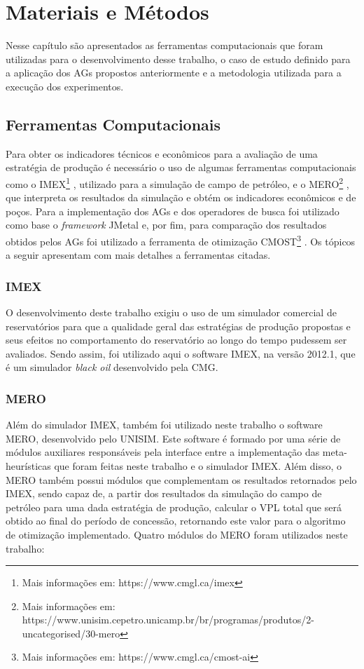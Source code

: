\chapter{Materiais e Métodos}
\label{ch:4_MateriaisMetodos}
Nesse capítulo são apresentados as ferramentas computacionais que foram utilizadas para o desenvolvimento desse trabalho, o caso de estudo definido para a aplicação dos AGs propostos anteriormente e a metodologia utilizada para a execução dos experimentos. 

\section{Ferramentas Computacionais}
\label{sec:4_FerramentasComputacionais}
Para obter os indicadores técnicos e econômicos para a avaliação de uma estratégia de produção é necessário o uso de algumas ferramentas computacionais como o IMEX\footnote{Mais informações em: https://www.cmgl.ca/imex} , utilizado para a simulação de campo de petróleo, e o MERO\footnote{Mais informações em: https://www.unisim.cepetro.unicamp.br/br/programas/produtos/2-uncategorised/30-mero} , que interpreta os resultados da simulação e obtém os indicadores econômicos e de poços. Para a implementação dos AGs e dos operadores de busca foi utilizado como base o \textit{framework} JMetal  e, por fim, para comparação dos resultados obtidos pelos AGs foi utilizado a ferramenta de otimização CMOST\footnote{Mais informações em: https://www.cmgl.ca/cmost-ai} . Os tópicos a seguir apresentam com mais detalhes a ferramentas citadas.

\subsection{IMEX}
\label{sec:4_IMEX}
O desenvolvimento deste trabalho exigiu o uso de um simulador comercial de reservatórios para que a qualidade geral das estratégias de produção propostas e seus efeitos no comportamento do reservatório ao longo do tempo pudessem ser avaliados. Sendo assim, foi utilizado aqui o software IMEX, na versão 2012.1, que é um simulador \textit{black oil} desenvolvido pela CMG. 

\subsection{MERO}
\label{sec:4_MERO}
Além do simulador IMEX, também foi utilizado neste trabalho o software MERO, desenvolvido pelo UNISIM. Este software é formado por uma série de módulos auxiliares responsáveis pela interface entre a implementação das meta-heurísticas que foram feitas neste trabalho e o simulador IMEX. Além disso, o MERO também possui módulos que complementam os resultados retornados pelo IMEX, sendo capaz de, a partir dos resultados da simulação do campo de petróleo para uma dada estratégia de produção, calcular o VPL total que será obtido ao final do período de concessão, retornando este valor para o algoritmo de otimização implementado. Quatro módulos do MERO foram utilizados neste trabalho:

